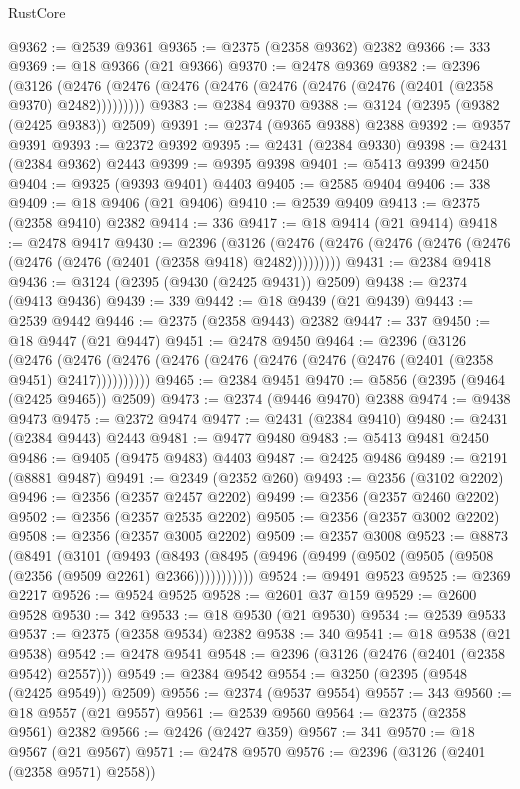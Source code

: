 \begin{lexlean}{RustCore}
\begin{coremodule}
@9362 := @2539 @9361
@9365 := @2375 (@2358 @9362) @2382
@9366 := 333
@9369 := @18 @9366 (@21 @9366)
@9370 := @2478 @9369
@9382 := @2396
    (@3126 (@2476 (@2476 (@2476 (@2476 (@2476 (@2476 (@2476 (@2401 (@2358 @9370) @2482)))))))))
@9383 := @2384 @9370
@9388 := @3124 (@2395 (@9382 (@2425 @9383)) @2509)
@9391 := @2374 (@9365 @9388) @2388
@9392 := @9357 @9391
@9393 := @2372 @9392
@9395 := @2431 (@2384 @9330)
@9398 := @2431 (@2384 @9362) @2443
@9399 := @9395 @9398
@9401 := @5413 @9399 @2450
@9404 := @9325 (@9393 @9401) @4403
@9405 := @2585 @9404
@9406 := 338
@9409 := @18 @9406 (@21 @9406)
@9410 := @2539 @9409
@9413 := @2375 (@2358 @9410) @2382
@9414 := 336
@9417 := @18 @9414 (@21 @9414)
@9418 := @2478 @9417
@9430 := @2396
    (@3126 (@2476 (@2476 (@2476 (@2476 (@2476 (@2476 (@2476 (@2401 (@2358 @9418) @2482)))))))))
@9431 := @2384 @9418
@9436 := @3124 (@2395 (@9430 (@2425 @9431)) @2509)
@9438 := @2374 (@9413 @9436)
@9439 := 339
@9442 := @18 @9439 (@21 @9439)
@9443 := @2539 @9442
@9446 := @2375 (@2358 @9443) @2382
@9447 := 337
@9450 := @18 @9447 (@21 @9447)
@9451 := @2478 @9450
@9464 := @2396
    (@3126
      (@2476 (@2476 (@2476 (@2476 (@2476 (@2476 (@2476 (@2476 (@2401 (@2358 @9451) @2417))))))))))
@9465 := @2384 @9451
@9470 := @5856 (@2395 (@9464 (@2425 @9465)) @2509)
@9473 := @2374 (@9446 @9470) @2388
@9474 := @9438 @9473
@9475 := @2372 @9474
@9477 := @2431 (@2384 @9410)
@9480 := @2431 (@2384 @9443) @2443
@9481 := @9477 @9480
@9483 := @5413 @9481 @2450
@9486 := @9405 (@9475 @9483) @4403
@9487 := @2425 @9486
@9489 := @2191 (@8881 @9487)
@9491 := @2349 (@2352 @260)
@9493 := @2356 (@3102 @2202)
@9496 := @2356 (@2357 @2457 @2202)
@9499 := @2356 (@2357 @2460 @2202)
@9502 := @2356 (@2357 @2535 @2202)
@9505 := @2356 (@2357 @3002 @2202)
@9508 := @2356 (@2357 @3005 @2202)
@9509 := @2357 @3008
@9523 := @8873
    (@8491
      (@3101
        (@9493
          (@8493 (@8495 (@9496 (@9499 (@9502 (@9505 (@9508 (@2356 (@9509 @2261) @2366)))))))))))
@9524 := @9491 @9523
@9525 := @2369 @2217
@9526 := @9524 @9525
@9528 := @2601 @37 @159
@9529 := @2600 @9528
@9530 := 342
@9533 := @18 @9530 (@21 @9530)
@9534 := @2539 @9533
@9537 := @2375 (@2358 @9534) @2382
@9538 := 340
@9541 := @18 @9538 (@21 @9538)
@9542 := @2478 @9541
@9548 := @2396 (@3126 (@2476 (@2401 (@2358 @9542) @2557)))
@9549 := @2384 @9542
@9554 := @3250 (@2395 (@9548 (@2425 @9549)) @2509)
@9556 := @2374 (@9537 @9554)
@9557 := 343
@9560 := @18 @9557 (@21 @9557)
@9561 := @2539 @9560
@9564 := @2375 (@2358 @9561) @2382
@9566 := @2426 (@2427 @359)
@9567 := 341
@9570 := @18 @9567 (@21 @9567)
@9571 := @2478 @9570
@9576 := @2396 (@3126 (@2401 (@2358 @9571) @2558))

\end{coremodule}
\end{lexlean}
